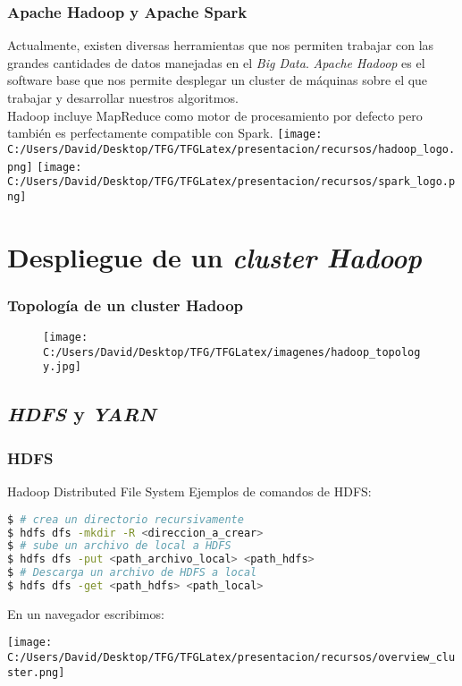 \documentclass{beamer}
\begin{document}
\begin{frame} %
  \frametitle{Apache Hadoop y Apache Spark}
  Actualmente, existen diversas herramientas que nos permiten trabajar con las grandes cantidades de datos
  manejadas en el \textit{Big Data}. \textit{Apache Hadoop} es el software base que nos permite desplegar
  un cluster de máquinas sobre el que trabajar y desarrollar nuestros algoritmos.\\
  Hadoop incluye MapReduce como motor de procesamiento por defecto pero también es perfectamente compatible con Spark.
  \texttt{[image: C:/Users/David/Desktop/TFG/TFGLatex/presentacion/recursos/hadoop\_logo.png]}%
  \texttt{[image: C:/Users/David/Desktop/TFG/TFGLatex/presentacion/recursos/spark\_logo.png]}
\end{frame}

\section{Despliegue de un \textit{cluster Hadoop}}

\begin{frame} %
\frametitle{Topología de un cluster Hadoop}
\begin{figure}
\centering
\texttt{[image: C:/Users/David/Desktop/TFG/TFGLatex/imagenes/hadoop\_topology.jpg]}
\end{figure}
\end{frame}


\subsection{\textit{HDFS} y \textit{YARN}}

\begin{frame}[fragile] %
\frametitle{HDFS}
\begin{block}{Hadoop Distributed File System}
Ejemplos de comandos de HDFS:
\begin{lstlisting}[language=bash, numbers=none, frame=single]
$ # crea un directorio recursivamente
$ hdfs dfs -mkdir -R <direccion_a_crear>
$ # sube un archivo de local a HDFS
$ hdfs dfs -put <path_archivo_local> <path_hdfs> 
$ # Descarga un archivo de HDFS a local
$ hdfs dfs -get <path_hdfs> <path_local> 
\end{lstlisting}
\end{block}

En un navegador escribimos: 

\texttt{[image: C:/Users/David/Desktop/TFG/TFGLatex/presentacion/recursos/overview\_cluster.png]}
\end{frame}
\end{document}
